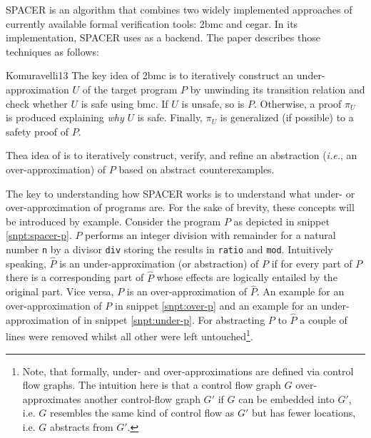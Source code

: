 SPACER \cite{Komuravelli13} is an algorithm that combines two widely implemented approaches of currently available formal verification tools: \gls{2bmc} and \gls{cegar}.
In its implementation, SPACER uses \muZ{} as a backend.
The paper describes those techniques as follows:
\begin{displaycquote}[p.1f]{Komuravelli13}
    The key idea of \gls{2bmc} is to iteratively construct an under-approximation  $ U $ of the target program $ P $ by unwinding its transition relation and check whether $ U $ is safe using \gls{bmc}.
    If $ U $ is unsafe, so is $ P $.
    Otherwise, a proof $ \pi_U $ is produced explaining \textit{why} $ U $ is safe.
    Finally, $ \pi_U $ is generalized (if possible) to a safety proof of $ P $.
    \textelp{}

    Thea idea of  is to iteratively construct, verify, and refine an abstraction (\textit{i.e.}, an over-approximation) of $ P $ based on abstract counterexamples.
\end{displaycquote}

The key to understanding how SPACER works is to understand what under- or over-approximation of programs are.
For the sake of brevity, these concepts will be introduced by example.
Consider the program $ P $ as depicted in snippet \ref{snpt:spacer-p}.
$ P $ performs an integer division with remainder for a natural number \lstinline{n} by a divisor \lstinline{div} storing the results in \lstinline{ratio} and \lstinline{mod}.
Intuitively speaking, $ \hat{P} $ is an under-approximation (or abstraction) of $ P $ if for every part of $ P $ there is a corresponding part of $ \hat{P} $ whose effects are logically entailed by the original part.
Vice versa, $ P $ is an over-approximation of $ \hat{P} $.
An example for an over-approximation of $ P $ in snippet \ref{snpt:over-p} and an example for an under-approximation of in snippet \ref{snpt:under-p}.
For abstracting $ P $ to $ \hat{P} $ a couple of lines were removed whilst all other were left untouched\footnote{%
    Note, that formally, under- and over-approximations are defined via control flow graphs.
    The intuition here is that a control flow graph $ G $ over-approximates another control-flow graph $ G' $ if $ G $ can be embedded into $ G' $, i.e. $ G $ resembles the same kind of control flow as $ G' $ but has fewer locations, i.e. $ G $ abstracts from $ G' $.
}.

